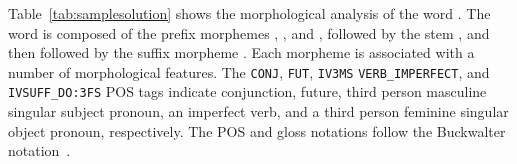 Table~\ref{tab:samplesolution} shows the morphological analysis
of the word . 
The word is composed of the prefix morphemes 
, , and , followed by the 
stem , and then followed by the suffix morpheme
. 
Each morpheme is associated with a number of morphological features.
The {\tt CONJ},
{\tt FUT}, 
{\tt IV3MS} 
{\tt VERB\_IMPERFECT}, and 
{\tt IVSUFF\_DO:3FS} POS tags indicate
conjunction, 
future, 
third person masculine singular subject pronoun,
an imperfect verb, and 
a third person feminine singular object pronoun, respectively.
The POS and gloss notations follow the Buckwalter notation~\cite{Buckwalter:02}.
